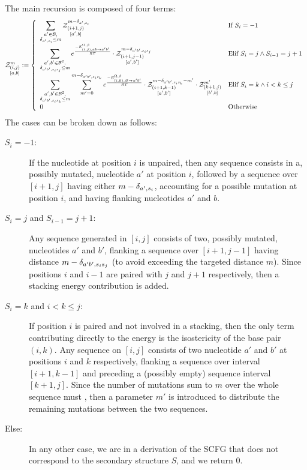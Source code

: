 The main recursion is composed of four terms:
\begin{equation}
	\Z{i,j}{m}{a,b}:=\left\{
  \begin{array}{ll}
  		\displaystyle
      \sum_{\substack{a'\in \B,\\ \Kron_{a',s_i}\le m}}  
      \Z{i+1,j}{m-\Kron_{a',s_i}}{a',b} & \text{If }S_{i}=-1\\
      \displaystyle
      \sum_{\substack{a',b'\in \B^2,\\ \Kron_{a'b',s_is_j}\le m}}
			 e^{\frac{-E_{(i,j),ab \to a'b'}^{\Omega,\beta}}{RT}}
			 \cdot \Z{i+1,j-1}{m-\Kron_{a'b',s_is_j}}{a',b'}&
			 \text{Elif }S_i=j \land S_{i-1}=j+1\\
			 \displaystyle
      \sum_{\substack{a',b'\in \B^2,\\ \Kron_{a'b',s_is_k}\le m}}
      \sum_{m'=0}^{m-\Kron_{a'b',s_is_k}}
   		 e^{\frac{-E_{(i,k),\varnothing\to a'b'}^{\Omega,\beta}}{RT}}
      \cdot\Z{i+1,k-1}{m-\Kron_{a'b',s_is_k}-m'}{a',b'}
      \cdot\Z{k+1,j}{m'}{b',b} & \text{Elif }S_i=k \land i < k \leq j\\
      0 &\text{Otherwise}
	\end{array}\right.
\label{eq:Z_rec}
\end{equation}
The cases can be broken down as follows:
\begin{description}
\item[$S_{i}=-1$:] If the nucleotide at position $i$ is unpaired, then 
any sequence consists in a, possibly mutated, nucleotide $a'$ at position  $i$, 
followed by a sequence over $[i+1,j]$ having either $m-\delta_{a',s_i}$, accounting for a possible mutation 
at position $i$, and having flanking nucleotides $a'$ and $b$.
\item[$S_i=j$ and $S_{i-1}=j+1$:] Any sequence generated in $[i,j]$ consists of two, possibly mutated, nucleotides $a'$ and $b'$, flanking a sequence over $[i+1,j-1]$ having distance $m-\delta_{a'b',s_is_j}$ (to avoid exceeding the targeted distance $m$).
Since positions $i$ and $i-1$ are paired with $j$ and $j+1$ respectively, 
then a stacking energy contribution is added. 
\item[$S_i=k$ and $i<k \leq j$:] If position $i$ is paired and not involved in a stacking, then the 
only term contributing directly to the energy is the isostericity of the base pair $(i,k)$. 
Any sequence on $[i,j]$ consists of two nucleotide $a'$ and $b'$ at positions $i$ and $k$ respectively, flanking a sequence over interval $[i+1,k-1]$ and preceding a (possibly empty) sequence interval $[k+1,j]$. Since the number of mutations sum to $m$ over the whole sequence must , then a parameter $m'$ is introduced to distribute the remaining mutations between the two sequences.
\item[Else:] In any other case, we are in a derivation of the SCFG that does not correspond to the secondary structure $S$, and we return $0$.
\end{description}

